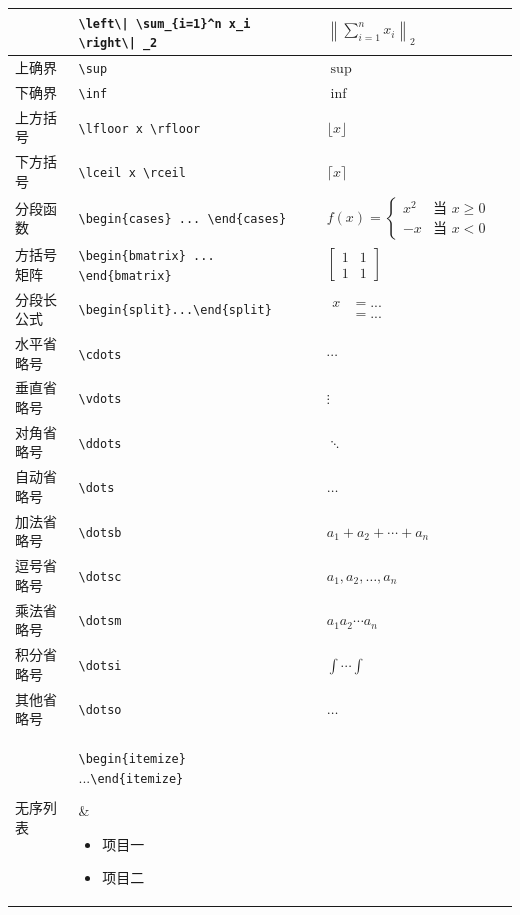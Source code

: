 \begin{longtable}{|l|p{4cm}|l|p{6cm}|}
  & \texttt{\textbackslash left\textbackslash| \textbackslash sum\_\{i=1\}\^{}n x\_i \textbackslash right\textbackslash| \_2} & $\left\| \sum_{i=1}^n x_i \right\|_2$ \\
\hline
上确界 & \verb|\sup| & $\sup$ \\
下确界 & \verb|\inf| & $\inf$  \\
\hline
上方括号 & \verb|\lfloor x \rfloor| & $\lfloor x \rfloor$ \\
下方括号 & \verb|\lceil x \rceil| & $\lceil x \rceil$  \\
\hline
分段函数 & \texttt{\textbackslash begin\{cases\} ... \textbackslash end\{cases\}}  & $f(x) = \begin{cases} x^2 & \text{当 } x \geq 0 \\ -x  & \text{当 } x < 0\end{cases}$  \\
\hline
方括号矩阵&\texttt{\textbackslash begin\{bmatrix\} ... \textbackslash end\{bmatrix\}} & $\begin{bmatrix}
     1&1\\1&1
\end{bmatrix}$  \\
\hline
分段长公式 & \texttt{\textbackslash begin\{split\}...\textbackslash end\{split\}} &
$\begin{aligned}
x &= ... \\
  &= ...
\end{aligned}$  \\
\hline
水平省略号 & \texttt{\textbackslash cdots} & $\cdots$ \\
垂直省略号 & \texttt{\textbackslash vdots} & $\vdots$  \\
对角省略号 & \texttt{\textbackslash ddots} & $\ddots$  \\
自动省略号 & \texttt{\textbackslash dots} & $\dots$  \\
加法省略号 & \texttt{\textbackslash dotsb} & $a_1 + a_2 + \dotsb + a_n$ \\
逗号省略号 & \texttt{\textbackslash dotsc} & $a_1, a_2, \dotsc, a_n$ \\
乘法省略号 & \texttt{\textbackslash dotsm} & $a_1 a_2 \dotsm a_n$ \\
积分省略号 & \texttt{\textbackslash dotsi} & $\int \dotsi \int$ \\
其他省略号 & \texttt{\textbackslash dotso} & $\dotso$ \\
\hline
无序列表 & \parbox[t]{4cm}{\texttt{\textbackslash begin\{itemize\}}\\...\texttt{\textbackslash end\{itemize\}}} & \parbox[t]{4.5cm}{\begin{itemize}\item 项目一\item 项目二\end{itemize}}  \\

\end{longtable}
